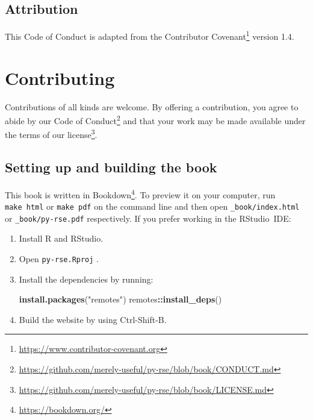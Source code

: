 \documentclass[
]{krantz}
\makeatletter
\newenvironment{Shaded}{\begin{snugshade}}{\end{snugshade}}
\newcommand{\KeywordTok}[1]{\textcolor[rgb]{0.13,0.29,0.53}{\textbf{#1}}}
\newcommand{\NormalTok}[1]{#1}
\newcommand{\OperatorTok}[1]{\textcolor[rgb]{0.81,0.36,0.00}{\textbf{#1}}}
\newcommand{\StringTok}[1]{\textcolor[rgb]{0.31,0.60,0.02}{#1}}
\renewcommand{\href}[2]{#2\footnote{\url{#1}}}
\newenvironment{kframe}{%
\medskip{}
\setlength{\fboxsep}{.8em}
 \def\at@end@of@kframe{}%
 \ifinner\ifhmode%
  \def\at@end@of@kframe{\end{minipage}}%
  \begin{minipage}{\columnwidth}%
 \fi\fi%
 \def\FrameCommand##1{\hskip\@totalleftmargin \hskip-\fboxsep
 \colorbox{shadecolor}{##1}\hskip-\fboxsep
     \hskip-\linewidth \hskip-\@totalleftmargin \hskip\columnwidth}%
 \MakeFramed {\advance\hsize-\width
   \@totalleftmargin\z@ \linewidth\hsize
   \@setminipage}}%
 {\par\unskip\endMakeFramed%
 \at@end@of@kframe}
\renewenvironment{Shaded}{\begin{kframe}}{\end{kframe}}
\makeatother
\begin{document}
\hypertarget{conduct-attribution}{%
\section{Attribution}\label{conduct-attribution}}

This Code of Conduct is adapted from the
\href{https://www.contributor-covenant.org}{Contributor Covenant} version 1.4.

\hypertarget{contributing}{%
\chapter{Contributing}\label{contributing}}

Contributions of all kinds are welcome. By offering a contribution, you agree
to abide by our
\href{https://github.com/merely-useful/py-rse/blob/book/CONDUCT.md}{Code of Conduct}
and that your work may be made available under the terms of our
\href{https://github.com/merely-useful/py-rse/blob/book/LICENSE.md}{license}.

\hypertarget{setting-up-and-building-the-book}{%
\section*{Setting up and building the book}\label{setting-up-and-building-the-book}}


This book is written in \href{https://bookdown.org/}{Bookdown}.
To preview it on your computer,
run \texttt{make\ html} or \texttt{make\ pdf} on the command line
and then open \texttt{\_book/index.html} or \texttt{\_book/py-rse.pdf} respectively.
If you prefer working in the RStudio~IDE:

\begin{enumerate}
\def\labelenumi{\arabic{enumi}.}
\item
  Install R and RStudio.
\item
  Open \texttt{py-rse.Rproj} .
\item
  Install the dependencies by running:

\begin{Shaded}
\begin{Highlighting}[]
\KeywordTok{install.packages}\NormalTok{(}\StringTok{"remotes"}\NormalTok{)}
\NormalTok{remotes}\OperatorTok{::}\KeywordTok{install\_deps}\NormalTok{()}
\end{Highlighting}
\end{Shaded}
\item
  Build the website by using Ctrl-Shift-B.
\end{enumerate}
\end{document}

